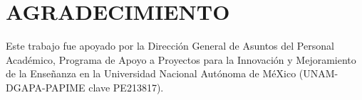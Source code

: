 \documentclass[12pt]{article}
\begin{document}
\section*{AGRADECIMIENTO}
Este trabajo fue apoyado por la Dirección General de Asuntos del
Personal Académico, Programa de Apoyo a Proyectos para la Innovación y
Mejoramiento de la Enseñanza en la Universidad Nacional Autónoma de
MéXico (UNAM-DGAPA-PAPIME clave PE213817).
 
\renewcommand\refname{REFERENCIAS}
\renewcommand{\markboth}[2]{}%
\begin{footnotesize}

\end{footnotesize}
\end{document}
